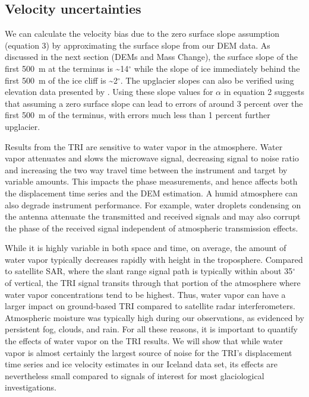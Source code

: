 
\subsection{Velocity uncertainties}
We can calculate the velocity bias due to the zero surface slope assumption (equation 3) by approximating the surface slope from our DEM data. As discussed in the next section (DEMs and Mass Change), the surface slope of the first 500~m at the terminus is \textasciitilde14$^\circ$ while the slope of ice immediately behind the first 500~m of the ice cliff is \textasciitilde2$^\circ$. The upglacier slopes can also be verified using elevation data presented by \citet{bjornsson2001jokulsarlon}. Using these slope values for $\alpha$ in equation 2 suggests that assuming a zero surface slope can lead to errors of around 3 percent over the first 500~m of the terminus, with errors much less than 1 percent further upglacier.

Results from the TRI are sensitive to water vapor in the atmosphere.  Water vapor attenuates and slows the microwave signal, decreasing signal to noise ratio and increasing the two way travel time between the instrument and target by variable amounts.  This impacts the phase measurements, and hence affects both the displacement time series and the DEM estimation.  A humid atmosphere can also degrade instrument performance.  For example, water droplets condensing on the antenna attenuate the transmitted and received signals and may also corrupt the phase of the received signal independent of atmospheric transmission effects.  

While it is highly variable in both space and time, on average, the amount of water vapor typically decreases rapidly with height in the troposphere.  Compared to satellite SAR, where the slant range signal path is typically within about 35$^{\circ}$ of vertical, the TRI signal transits through that portion of the atmosphere where water vapor concentrations tend to be highest.  Thus, water vapor can have a larger impact on ground-based TRI compared to satellite radar interferometers. Atmospheric moisture was typically high during our observations, as evidenced by persistent fog, clouds, and rain. For all these reasons, it is important to quantify the effects of water vapor on the TRI results.  We will show that while water vapor is almost certainly the largest source of noise for the TRI’s displacement time series and ice velocity estimates in our Iceland data set, its effects are nevertheless small compared to signals of interest for most glaciological investigations.  

